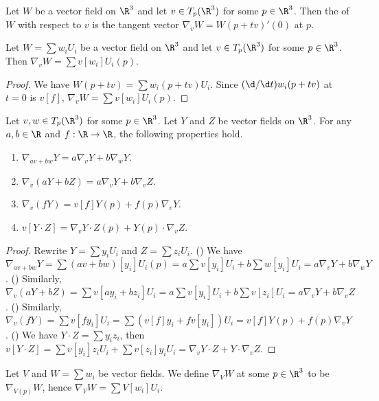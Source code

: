 \documentclass[10pt]{article}
\begin{document}
\begin{definition}
    Let $W$ be a vector field on ${\R}^{3}$ and let $v\in{T}_{p}({\R}^{3})$ for some $p\in{\R}^{3}$. Then the  of $W$ with respect to $v$ is the tangent vector ${\nabla}_{v}W=W(p+tv)'(0)$ at $p$.
\end{definition}
\begin{proposition}
    Let $W=\sum{w}_{i}{U}_{i}$ be a vector field on ${\R}^{3}$ and let $v\in{T}_{p}({\R}^{3})$ for some $p\in{\R}^{3}$. Then ${\nabla}_{v}W=\sum v[{w}_{i}]{U}_{i}(p)$.
\end{proposition}
\begin{proof}
    We have $W(p+tv)=\sum{w}_{i}(p+tv){U}_{i}$. Since $(\d/\d t){w}_{i}(p+tv)$ at $t=0$ is $v[f]$, ${\nabla}_{v}W=\sum v[{w}_{i}]{U}_{i}(p)$.
\end{proof}
\begin{proposition}
    Let $v,w\in{T}_{p}({\R}^{3})$ for some $p\in{\R}^{3}$. Let $Y$ and $Z$ be vector fields on ${\R}^{3}$. For any $a,b\in\R$ and $f:\R\to\R$, the following properties hold.
    \begin{enumerate}
        \item ${\nabla}_{av+bw}Y=a{\nabla}_{v}Y+b{\nabla}_{w}Y$.
        \item ${\nabla}_{v}(aY+bZ)=a{\nabla}_{v}Y+b{\nabla}_{v}Z$.
        \item ${\nabla}_{v}(fY)=v[f]Y(p)+f(p){\nabla}_{v}Y$.
        \item $v[Y\cdot Z]={\nabla}_{v}Y\cdot Z(p)+Y(p)\cdot{\nabla}_{v}Z$.
    \end{enumerate}
\end{proposition}
\begin{proof}
    Rewrite $Y=\sum{y}_{i}{U}_{i}$ and $Z=\sum{z}_{i}{U}_{i}$. () We have ${\nabla}_{av+bw}Y=\sum(av+bw)[{y}_{i}]{U}_{i}(p)=a\sum v[{y}_{i}]{U}_{i}+b\sum w[{y}_{i}]{U}_{i}=a{\nabla}_{v}Y+b{\nabla}_{w}Y$. () Similarly, ${\nabla}_{v}(aY+bZ)=\sum v[a{y}_{i}+b{z}_{i}]{U}_{i}=a\sum v[{y}_{i}]{U}_{i}+b\sum v[{z}_{i}]{U}_{i}=a{\nabla}_{v}Y+b{\nabla}_{v}Z$. () Similarly, ${\nabla}_{v}(fY)=\sum v[f{y}_{i}]{U}_{i}=\sum(v[f]{y}_{i}+fv[{y}_{i}]){U}_{i}=v[f]Y(p)+f(p){\nabla}_{v}Y$. () We have $Y\cdot Z=\sum{y}_{i}{z}_{i}$, then $v[Y\cdot Z]=\sum v[{y}_{i}]{z}_{i}{U}_{i}+\sum v[{z}_{i}]{y}_{i}{U}_{i}={\nabla}_{v}Y\cdot Z+Y\cdot{\nabla}_{v}Z$.
\end{proof}
\par
Let $V$ and $W=\sum{w}_{i}$ be vector fields. We define ${\nabla}_{V}W$ at some $p\in{\R}^{3}$ to be ${\nabla}_{V(p)}W$, hence ${\nabla}_{V}W=\sum V[{w}_{i}]{U}_{i}$.
\end{document}
